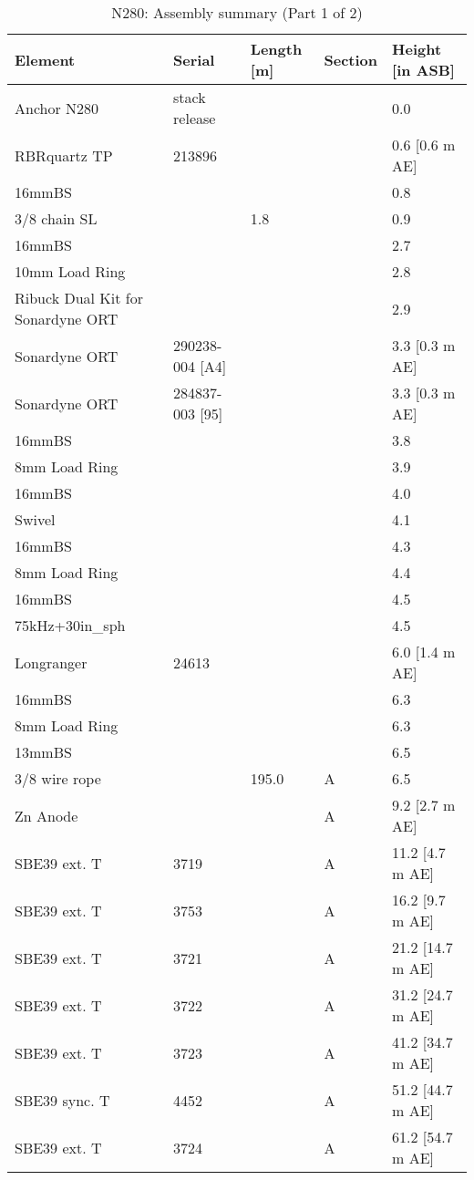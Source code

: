 \documentclass{article}
\begin{document}
\begin{table}[!htbp]
\centering
\caption{N280: Assembly summary (Part 1 of 2)}
\begin{tabular}{lllll}
\toprule
Element & Serial & Length [m] & Section & Height [in ASB] \\
\midrule
Anchor N280 & stack release &  &  & 0.0 \\
RBRquartz TP & 213896 &  &  & 0.6 [0.6 m AE] \\
16mmBS &  &  &  & 0.8 \\
3/8 chain SL &  & 1.8 &  & 0.9 \\
16mmBS &  &  &  & 2.7 \\
10mm Load Ring &  &  &  & 2.8 \\
Ribuck Dual Kit for Sonardyne ORT &  &  &  & 2.9 \\
Sonardyne ORT & 290238-004 [A4] &  &  & 3.3 [0.3 m AE] \\
Sonardyne ORT & 284837-003 [95] &  &  & 3.3 [0.3 m AE] \\
16mmBS &  &  &  & 3.8 \\
8mm Load Ring &  &  &  & 3.9 \\
16mmBS &  &  &  & 4.0 \\
Swivel &  &  &  & 4.1 \\
16mmBS &  &  &  & 4.3 \\
8mm Load Ring &  &  &  & 4.4 \\
16mmBS &  &  &  & 4.5 \\
75kHz+30in\_sph &  &  &  & 4.5 \\
Longranger & 24613 &  &  & 6.0 [1.4 m AE] \\
16mmBS &  &  &  & 6.3 \\
8mm Load Ring &  &  &  & 6.3 \\
13mmBS &  &  &  & 6.5 \\
3/8 wire rope &  & 195.0 & A & 6.5 \\
Zn Anode &  &  & A & 9.2 [2.7 m AE] \\
SBE39 ext. T & 3719 &  & A & 11.2 [4.7 m AE] \\
SBE39 ext. T & 3753 &  & A & 16.2 [9.7 m AE] \\
SBE39 ext. T & 3721 &  & A & 21.2 [14.7 m AE] \\
SBE39 ext. T & 3722 &  & A & 31.2 [24.7 m AE] \\
SBE39 ext. T & 3723 &  & A & 41.2 [34.7 m AE] \\
SBE39 sync. T & 4452 &  & A & 51.2 [44.7 m AE] \\
SBE39 ext. T & 3724 &  & A & 61.2 [54.7 m AE] \\

\end{tabular}
\end{table}
\end{document}

